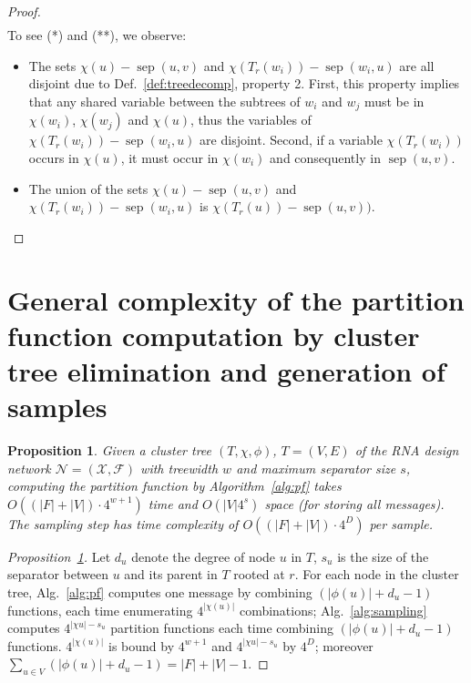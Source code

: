 \documentclass{bioinfo}
\newtheorem{proposition}[theorem]{Proposition}
\newcommand{\network}{\mathcal{N}}
\newcommand{\separator}[2]{\operatorname{sep}(#1,#2)}
\newcommand{\F}{\mathcal{F}}
\newcommand{\X}{\mathcal{X}}
\begin{document}
\begin{proof}
\begin{align*}
\end{align*}
To see (*) and (**), we observe:
\begin{itemize}
\item The sets $\chi(u)-\separator{u}{v}$ and
  $\chi(T_r(w_i))-\separator{w_i}{u}$ are all disjoint due to
  Def.~\ref{def:treedecomp}, property 2. First, this property implies
  that any shared variable between the subtrees of $w_i$ and $w_j$
  must be in $\chi(w_i)$, $\chi(w_j)$ and $\chi(u)$, thus the
  variables of $\chi(T_r(w_i))-\separator{w_i}{u}$ are
  disjoint. Second, if a variable $\chi(T_r(w_i))$ occurs in
  $\chi(u)$, it must occur in $\chi(w_i)$ and consequently in $\separator{u}{v}$.
\item The union of the sets $\chi(u)-\separator{u}{v}$ and
  $\chi(T_r(w_i))-\separator{w_i}{u}$ is $\chi(T_r(u))-\separator{u}{v}).$
\end{itemize}

\end{proof}

\section{General complexity of the partition function computation by cluster tree elimination and generation of samples}
\label{appsec:algcomplexity}

\begin{proposition}
  \label{prop:general-complexity}
Given a cluster tree $(T,\chi,\phi)$, $T=(V,E)$ of the RNA design network $\network=(\X,\F)$ with treewidth $w$ and maximum separator size $s$, computing the partition function by Algorithm~\ref{alg:pf} takes $O((|F|+|V|)\cdot 4^{w+1})$ time and $O(|V| 4^s)$ space (for storing all messages). The sampling step has time complexity of $O((|F|+|V|)\cdot 4^D)$ per sample.
\end{proposition}

\begin{proof}[Proposition~\ref{prop:general-complexity}]
Let $d_u$ denote the degree of node $u$ in $T$, $s_u$ is the size of the separator between 
$u$ and its parent in $T$ rooted at $r$. For each node in the cluster tree, Alg.~\ref{alg:pf} computes one message by combining $(|\phi(u)|+d_u-1)$ functions, each time enumerating $4^{|\chi(u)|}$ combinations; Alg.~\ref{alg:sampling} computes $4^{|\chi{u}|-s_u}$ partition functions each time combining $(|\phi(u)|+d_u-1)$ functions.  $4^{|\chi(u)|}$ is bound by $4^{w+1}$ and $4^{|\chi{u}|-s_u}$ by $4^D$; moreover $\sum_{u\in V} (|\phi(u)|+d_u-1) = |F|+|V|-1$.
\end{proof}
\end{document}
